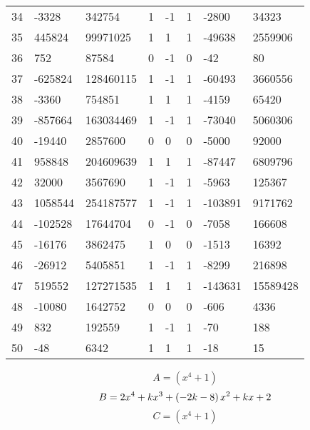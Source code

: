 \documentclass{amsart}
\begin{document}
\begin{longtable}{|l|l|l|lllll|}
34&-3328&342754&1&-1&1&-2800&34323\\
35&445824&99971025&1&1&1&-49638&2559906\\
36&752&87584&0&-1&0&-42&80\\
37&-625824&128460115&1&-1&1&-60493&3660556\\
38&-3360&754851&1&1&1&-4159&65420\\
39&-857664&163034469&1&-1&1&-73040&5060306\\
40&-19440&2857600&0&0&0&-5000&92000\\
41&958848&204609639&1&1&1&-87447&6809796\\
42&32000&3567690&1&-1&1&-5963&125367\\
43&1058544&254187577&1&-1&1&-103891&9171762\\
44&-102528&17644704&0&-1&0&-7058&166608\\
45&-16176&3862475&1&0&0&-1513&16392\\
46&-26912&5405851&1&-1&1&-8299&216898\\
47&519552&127271535&1&1&1&-143631&15589428\\
48&-10080&1642752&0&0&0&-606&4336\\
49&832&192559&1&-1&1&-70&188\\
50&-48&6342&1&1&1&-18&15\\
\hline
\end{longtable}
$$A=(x^4
 + 1)$$
$$B=2\*x^4
 + k\*x^3
 + \left(-2\*k
 - 8\right) \*x^2
 + k\*x
 + 2$$
$$C=(x^4
 + 1)$$
\end{document}
